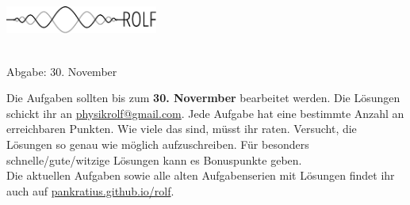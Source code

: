 \documentclass[a4paper]{article}
\begin{document}
	\vspace*{-1cm}
	\parbox{4cm}{\vspace{-0.2cm}\includegraphics[width=5cm]{../images/logo_scaled.pdf}}
	\parbox{10.6cm}{ \\
			Abgabe: 30. November \\ \vspace*{-.5cm} }
		\vspace{0.5cm}

\thispagestyle{empty}
\begin{framed}
	\noindent
	\scriptsize
	Die Aufgaben sollten bis zum \textbf{30. Novermber} bearbeitet werden. Die Lösungen schickt ihr an \href{mailto:physikrolf@gmail.com}{physikrolf@gmail.com}.
	Jede Aufgabe hat eine bestimmte Anzahl an erreichbaren Punkten. Wie viele das sind, müsst ihr raten. Versucht, die Lösungen so genau wie möglich aufzuschreiben. Für besonders schnelle/gute/witzige Lösungen kann es Bonuspunkte geben.\\ Die aktuellen Aufgaben sowie alle alten Aufgabenserien mit Lösungen findet ihr auch auf \url{pankratius.github.io/rolf}. %
\end{framed}

\noindent




\end{document}

